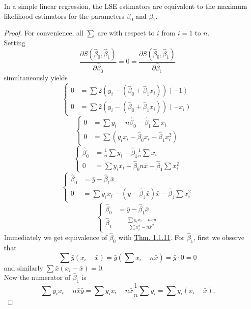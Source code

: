 \documentclass[11pt,fleqn]{book} %
\begin{document}
\begin{theorem} \label{thm:1116}
In a simple linear regression, the LSE estimators are equivalent to the maximum likelihood estimators for the parameters \(\beta_0\) and \(\beta_1\).
\end{theorem}
\begin{proof} For convenience, all \(\sum\) are with respcet to \(i\) from \(i = 1\) to \(n\). \\
\indent Setting
\[
\frac{\partial S(\hat{\beta}_0, \hat{\beta}_1)}{\partial\hat{\beta}_0} = 0 = \frac{\partial S(\hat{\beta}_0, \hat{\beta}_1)}{\partial\hat{\beta}_1}
\]
simultaneously yields
\[
\left\{
\begin{array}{rl}
0 &= \sum 2(y_i - (\hat{\beta}_0 + \hat{\beta}_1x_i))(-1) \\
0 &= \sum 2(y_i - (\hat{\beta}_0 + \hat{\beta}_1x_i))(-x_i)
\end{array}
\right.
\]
\[
\left\{
\begin{array}{rl}
0 &= \sum y_i - n\hat{\beta}_0 - \hat{\beta}_1 \sum x_i \\
0 &= \sum (y_ix_i - \hat{\beta}_0x_i - \hat{\beta}_1x_i^2)
\end{array}
\right.
\]
\[
\left\{
\begin{array}{rl}
\hat{\beta}_0 &= \frac1n\sum y_i - \hat{\beta}_1\frac1n\sum x_i \\
0 &= \sum y_ix_i - \hat{\beta}_0n\bar{x} - \hat{\beta}_1 \sum x_i^2
\end{array}
\right.
\]
\[
\left\{
\begin{array}{rl}
\hat{\beta}_0 &= \bar{y} - \hat{\beta}_1\bar{x} \\
0 &= \sum y_ix_i - (y - \hat{\beta}_1\bar{x})\bar{x} - \hat{\beta}_1\sum x_i^2
\end{array}
\right.
\]
\[
\left\{
\begin{array}{rl}
\hat{\beta}_0 &= \bar{y} - \hat{\beta}_1\bar{x} \\
\hat{\beta}_1 &= \frac{\sum y_ix_i - n\bar{x}\bar{y}}{\sum x_i^2 - n\bar{x}^2}
\end{array}
\right.
\]
\indent Immediately we get equivalence of \(\hat{\beta}_0\) with \hyperref[thm:1111]{Thm. 1.1.11}. For \(\hat{\beta}_1\), first we observe that
\[
\sum\bar{y}(x_i - \bar{x}) = \bar{y}(\sum x_i - n\bar{x}) = \bar{y}\cdot0 = 0
\]
and similarly \(\sum\bar{x}(x_i - \bar{x}) = 0\). \\
\indent Now the numerator of \(\hat{\beta}_1\) is
\[
\sum y_ix_i - n\bar{x}\bar{y} = \sum y_ix_i - n\bar{x}\frac1n\sum y_i = \sum y_i(x_i - \bar{x}).
\]
\end{proof}
\end{document}
